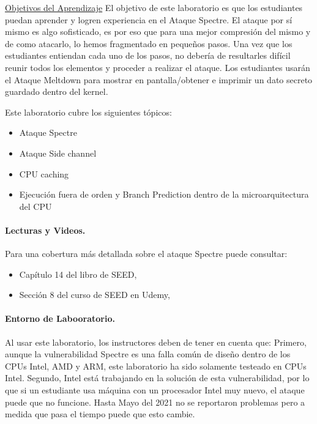 \underline{Objetivos del Aprendizaje} El objetivo de este laboratorio es que los estudiantes puedan aprender y logren experiencia en el Ataque Spectre. El ataque por sí mismo es algo sofisticado, es por eso que para una mejor compresión del mismo y de como atacarlo, lo hemos fragmentado en pequeños pasos. Una vez que los estudiantes entiendan cada uno de los pasos, no debería de resultarles difícil reunir todos los elementos y proceder a realizar el ataque. Los estudiantes usarán el Ataque Meltdown para mostrar en pantalla/obtener e imprimir un dato secreto guardado dentro del kernel.

Este laboratorio cubre los siguientes tópicos:


\begin{itemize}[noitemsep]
\item Ataque Spectre
\item Ataque Side channel
\item CPU caching
\item Ejecución fuera de orden y Branch Prediction dentro de la microarquitectura del CPU
\end{itemize}



\paragraph{Lecturas y Videos.}
Para una cobertura más detallada sobre el ataque Spectre puede consultar:

\begin{itemize}
\item Capítulo 14 del libro de SEED, \seedbook
\item Sección 8 del curso de SEED en Udemy, \seedcsvideo
\end{itemize}


\paragraph{Entorno de Labooratorio.} \seedenvironmentAB

Al usar este laboratorio, los instructores deben de tener en cuenta que:
Primero, aunque la vulnerabilidad Spectre es una falla común de diseño dentro de los CPUs Intel, AMD y ARM, este laboratorio ha sido solamente testeado en CPUs Intel.
Segundo, Intel está trabajando en la solución de esta vulnerabilidad, por lo que si un estudiante usa máquina con un procesador Intel muy nuevo, el ataque puede que no funcione. Hasta Mayo del 2021 no se reportaron problemas pero a medida que pasa el tiempo puede que esto cambie.

